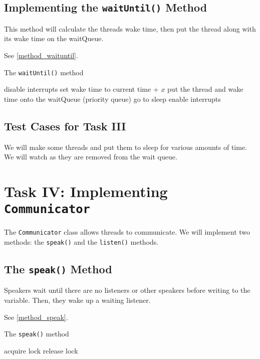\documentclass[12pt, letterpaper]{report}
\newcommand{\code}[1]{\texttt{#1}}
\begin{document}
\subsection*{Implementing the \code{waitUntil()} Method}

This method will calculate the threads wake time, then put the thread along with its wake time on the waitQueue.

See \vref{method_waituntil}.

\begin{algorithm}[!ht]
  \caption{The \code{waitUntil()} method}
  \label{method_waituntil}
  \SetAlgoLined
    disable interrupts\;
    set wake time to current time + $x$\;
    put the thread and wake time onto the waitQueue (priority queue)\;
    go to sleep\;
    enable interrupts\;
\end{algorithm}

\subsection*{Test Cases for Task III}

We will make some threads and put them to sleep for various amounts of time. We will watch as they are removed from the wait queue.


\section*{Task IV: Implementing \code{Communicator}}

The \code{Communicator} class allows threads to communicate. We will implement two methods: the \code{speak()} and the \code{listen()} methods.

\subsection*{The \code{speak()} Method}

Speakers wait until there are no listeners or other speakers before writing to the variable. Then, they wake up a waiting listener.

See \vref{method_speak}.

\begin{algorithm}[!ht]
  \caption{The \code{speak()} method}
  \label{method_speak}
    \SetAlgoLined
  acquire lock\;
  release lock\;
\end{algorithm}
\end{document}
